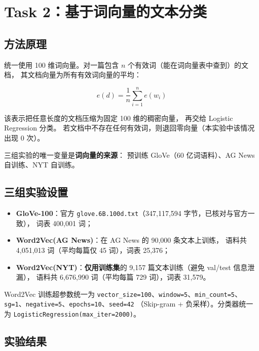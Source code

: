 \documentclass[12pt,a4paper]{ctexart}
\newcommand{\fpath}[1]{\texttt{#1}}
\begin{document}
\section{Task 2：基于词向量的文本分类}

\subsection{方法原理}

统一使用 100 维词向量。对一篇包含 $n$ 个有效词（能在词向量表中查到）的文档，
其文档向量为所有有效词向量的平均：

\begin{equation}
e(d) = \frac{1}{n}\sum_{i=1}^{n} e(w_i)
\end{equation}

该表示把任意长度的文档压缩为固定 100 维的稠密向量，
再交给 Logistic Regression 分类。
若文档中不存在任何有效词，则退回零向量（本实验中该情况出现 0 次）。

三组实验的唯一变量是\textbf{词向量的来源}：
预训练 GloVe（60 亿词语料）、AG News 自训练、NYT 自训练。

\subsection{三组实验设置}

\begin{itemize}
  \item \textbf{GloVe-100}：官方 \fpath{glove.6B.100d.txt}（347,117,594 字节，已核对与官方一致），
        词表 400,001 词；
  \item \textbf{Word2Vec(AG News)}：在 AG News 的 90,000 条文本上训练，
        语料共 4,051,013 词（平均每篇仅 45 词），词表 25,376；
  \item \textbf{Word2Vec(NYT)}：\textbf{仅用训练集}的 9,157 篇文本训练（避免 val/test 信息泄漏），
        语料共 6,676,990 词（平均每篇 729 词），词表 31,579。
\end{itemize}

Word2Vec 训练超参数统一为 \fpath{vector\_size=100}、\fpath{window=5}、\fpath{min\_count=5}、
\fpath{sg=1}、\fpath{negative=5}、\fpath{epochs=10}、\fpath{seed=42}
（Skip-gram + 负采样）。分类器统一为 \fpath{LogisticRegression(max\_iter=2000)}。

\subsection{实验结果}
\end{document}

